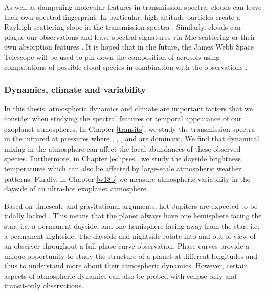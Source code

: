 
As well as dampening molecular features in transmission spectra, clouds can leave their own spectral fingerprint. In particular, high altitude  particles create a Rayleigh scattering slope in the transmission spectra
\citep[e.g.,][]{LecavelierdesEtangs2008,Sing2015, Sing2016, Gibson2017}. Similarly, clouds can plague our observations and leave spectral signatures via Mie scattering \citep[e.g.,][]{Benneke2019} or their own absorption features \citep[e.g.,][]{Wakeford2015}. It is hoped that in the future, the James Webb Space Telescope will be used to pin down the composition of aerosols using computations of possible cloud species in combination with the observations \citep[e.g.,][]{Gao2020}.

\subsubsection{Dynamics, climate and variability}

\label{int:sec:variability}

In this thesis, atmospheric dynamics and climate are important factors that we consider when studying the spectral features or temporal appearance of our exoplanet atmospheres. In Chapter \ref{transits}, we study the transmission spectra in the infrared at pressures where , , , and  are dominant. We find that dynamical mixing in the atmosphere can affect the local abundances of these observed species. Furthermore, in Chapter \ref{eclipses}, we study the dayside brightness temperatures which can also be affected by large-scale atmospheric weather patterns. Finally, in Chapter \ref{w18b} we measure atmospheric variability in the dayside of an ultra-hot exoplanet atmosphere.

Based on timescale and gravitational arguments, hot Jupiters are expected to be tidally locked \citep[e.g.,][]{Rasio1996, Guillot1996}. This means that the planet always have one hemisphere facing the star, i.e. a permanent dayside, and one hemisphere facing away from the star, i.e. a permanent nightside. The dayside and nightside rotate into and out of view of an observer throughout a full phase curve observation. Phase curves provide a unique opportunity to study the structure of a planet at different longitudes and thus to understand more about their atmospheric dynamics. However, certain aspects of atmospheric dynamics can also be probed with eclipse-only and transit-only observations.


